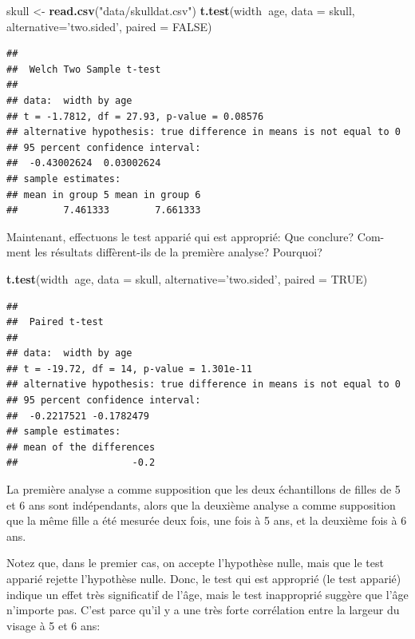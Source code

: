 \documentclass[12pt,]{book}
\newenvironment{Shaded}{\begin{snugshade}}{\end{snugshade}}
\newcommand{\DataTypeTok}[1]{\textcolor[rgb]{0.27,0.27,0.27}{#1}}
\newcommand{\KeywordTok}[1]{\textcolor[rgb]{0.27,0.27,0.27}{\textbf{#1}}}
\newcommand{\NormalTok}[1]{#1}
\newcommand{\OperatorTok}[1]{\textcolor[rgb]{0.43,0.43,0.43}{\textbf{#1}}}
\newcommand{\OtherTok}[1]{\textcolor[rgb]{0.37,0.37,0.37}{#1}}
\newcommand{\StringTok}[1]{\textcolor[rgb]{0.5,0.5,0.5}{#1}}
\begin{document}
\begin{Shaded}
\begin{Highlighting}[]
\NormalTok{skull <-}\StringTok{ }\KeywordTok{read.csv}\NormalTok{(}\StringTok{"data/skulldat.csv"}\NormalTok{)}
\KeywordTok{t.test}\NormalTok{(width}\OperatorTok{~}\NormalTok{age, }\DataTypeTok{data =}\NormalTok{ skull,}
  \DataTypeTok{alternative=}\StringTok{'two.sided'}\NormalTok{,}
  \DataTypeTok{paired =} \OtherTok{FALSE}\NormalTok{)}
\end{Highlighting}
\end{Shaded}

\begin{verbatim}
## 
## 	Welch Two Sample t-test
## 
## data:  width by age
## t = -1.7812, df = 27.93, p-value = 0.08576
## alternative hypothesis: true difference in means is not equal to 0
## 95 percent confidence interval:
##  -0.43002624  0.03002624
## sample estimates:
## mean in group 5 mean in group 6 
##        7.461333        7.661333
\end{verbatim}

Maintenant, effectuons le test apparié qui est approprié: Que conclure? Com- ment les résultats diffèrent-ils de la première analyse? Pourquoi?

\begin{Shaded}
\begin{Highlighting}[]
\KeywordTok{t.test}\NormalTok{(width}\OperatorTok{~}\NormalTok{age, }\DataTypeTok{data =}\NormalTok{ skull,}
  \DataTypeTok{alternative=}\StringTok{'two.sided'}\NormalTok{,}
  \DataTypeTok{paired =} \OtherTok{TRUE}\NormalTok{)}
\end{Highlighting}
\end{Shaded}

\begin{verbatim}
## 
## 	Paired t-test
## 
## data:  width by age
## t = -19.72, df = 14, p-value = 1.301e-11
## alternative hypothesis: true difference in means is not equal to 0
## 95 percent confidence interval:
##  -0.2217521 -0.1782479
## sample estimates:
## mean of the differences 
##                    -0.2
\end{verbatim}

La première analyse a comme supposition que les deux échantillons de filles de 5 et 6 ans sont indépendants, alors que la deuxième analyse a comme supposition que la même fille a été mesurée deux fois, une fois à 5 ans, et la deuxième fois à 6 ans.

Notez que, dans le premier cas, on accepte l'hypothèse nulle, mais que le test apparié rejette l'hypothèse nulle. Donc, le test qui est approprié (le test apparié) indique un effet très significatif de l'âge, mais le test inapproprié suggère que l'âge n'importe pas. C'est parce qu'il y a une très forte corrélation entre la largeur du visage à 5 et 6 ans:
\end{document}
